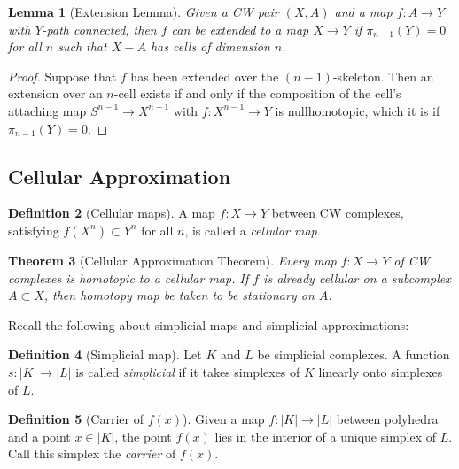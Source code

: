 \documentclass[reqno]{amsart}
\newtheorem{theorem}{Theorem}[section]
\newtheorem{lemma}[theorem]{Lemma}
\theoremstyle{definition}
\newtheorem{definition}[theorem]{Definition}
\theoremstyle{remark}
\begin{document}
\begin{lemma}[Extension Lemma]
    Given a CW pair $\left( X,A \right) $ and a map
    $f \colon A \to Y$ with $Y$-path connected,
    then $f$ can be extended to a map
    $X \to Y$ if $\pi_{n-1}(Y) = 0$ for all $n$ such that
    $X -A$ has cells of dimension $n$.
\end{lemma}

\begin{proof}
    Suppose that $f$ has been extended over the
    $\left( n-1 \right) $-skeleton. Then an extension
    over an $n$-cell exists if and only if
    the composition of the cell's attaching
    map $S^{n-1} \to X^{n-1}$ with $f
    \colon X^{n-1} \to Y$ is nullhomotopic, which
    it is if $\pi_{n-1} (Y) = 0$.
\end{proof}

\subsection{Cellular Approximation}

\begin{definition}[Cellular maps]
    A map $f \colon X \to Y$ between CW complexes,
    satisfying
    $f(X^{n}) \subset Y^{n}$ for all $n$, is called
    a \textit{cellular map}.
\end{definition}

\begin{theorem}[Cellular Approximation Theorem]
    Every map $f \colon X \to Y$ of CW complexes is homotopic
    to a cellular map. If $f$ is already cellular
    on a subcomplex $A \subset X$, then homotopy
    map be taken to be stationary on $A$.
\end{theorem}

Recall the following about simplicial maps and simplicial
approximations:

\begin{definition}[Simplicial map]
    Let $K$ and $L$ be simplicial complexes. A function
    $s \colon \left| K \right| \to \left| L \right| $ 
    is called \textit{simplicial} if it takes simplexes
    of $K$ linearly onto simplexes of $L$.
\end{definition}

\begin{definition}[Carrier of $f(x)$]
    Given a map  $f \colon \left| K \right| 
    \to \left| L \right| $ between polyhedra and a
    point $x \in \left| K \right| $, the point
    $f(x)$ lies in the interior of a unique simplex of
    $L$. Call this simplex the \textit{carrier} of 
    $f(x)$.
\end{definition}
\end{document}
